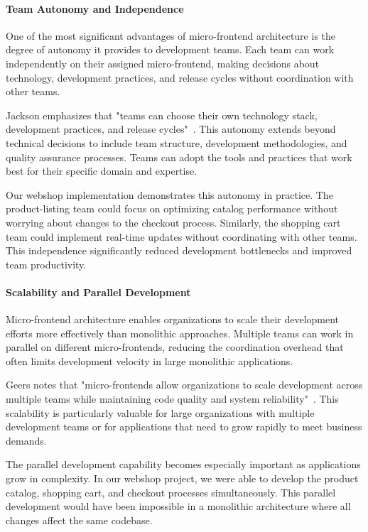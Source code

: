 \documentclass[12pt,a4paper]{report}
\begin{document}
\paragraph{Team Autonomy and Independence}

One of the most significant advantages of micro-frontend architecture is the degree of autonomy it provides to development teams. Each team can work independently on their assigned micro-frontend, making decisions about technology, development practices, and release cycles without coordination with other teams.

Jackson emphasizes that "teams can choose their own technology stack, development practices, and release cycles"~\cite{jackson2016microfrontends}. This autonomy extends beyond technical decisions to include team structure, development methodologies, and quality assurance processes. Teams can adopt the tools and practices that work best for their specific domain and expertise.

Our webshop implementation demonstrates this autonomy in practice. The product-listing team could focus on optimizing catalog performance without worrying about changes to the checkout process. Similarly, the shopping cart team could implement real-time updates without coordinating with other teams. This independence significantly reduced development bottlenecks and improved team productivity.

\paragraph{Scalability and Parallel Development}

Micro-frontend architecture enables organizations to scale their development efforts more effectively than monolithic approaches. Multiple teams can work in parallel on different micro-frontends, reducing the coordination overhead that often limits development velocity in large monolithic applications.

Geers notes that "micro-frontends allow organizations to scale development across multiple teams while maintaining code quality and system reliability"~\cite{geers2019microfrontends}. This scalability is particularly valuable for large organizations with multiple development teams or for applications that need to grow rapidly to meet business demands.

The parallel development capability becomes especially important as applications grow in complexity. In our webshop project, we were able to develop the product catalog, shopping cart, and checkout processes simultaneously. This parallel development would have been impossible in a monolithic architecture where all changes affect the same codebase.
\end{document}
